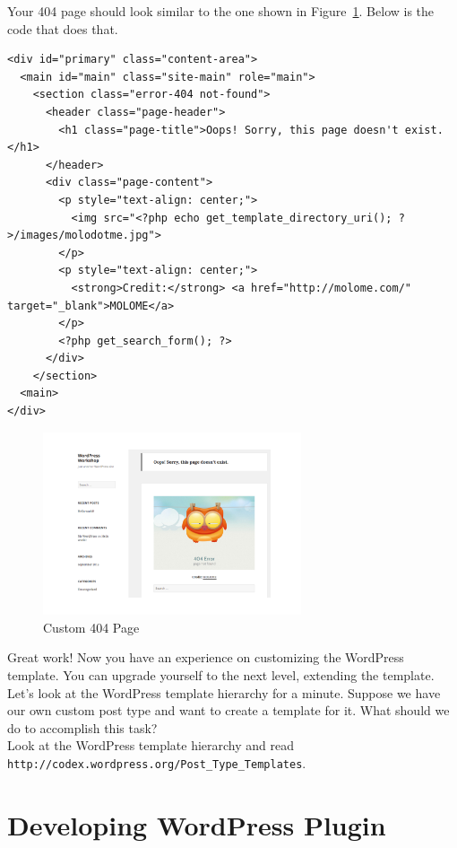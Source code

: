 \documentclass{article}
\begin{document}
\noindent Your 404 page should look similar to the one shown in
Figure~\ref{fig:custom-404-page}. Below is the code that does that.

\begin{verbatim}
<div id="primary" class="content-area">
  <main id="main" class="site-main" role="main">
    <section class="error-404 not-found">
      <header class="page-header">
        <h1 class="page-title">Oops! Sorry, this page doesn't exist.</h1>
      </header>
      <div class="page-content">
        <p style="text-align: center;">
          <img src="<?php echo get_template_directory_uri(); ?>/images/molodotme.jpg">
        </p>
        <p style="text-align: center;">
          <strong>Credit:</strong> <a href="http://molome.com/" target="_blank">MOLOME</a>
        </p>
        <?php get_search_form(); ?>
      </div>
    </section>
  <main>
</div>
\end{verbatim}

\begin{figure}[t]
    \centering
    \includegraphics[width=3in]{figures/custom-404-page}
    \caption{Custom 404 Page}
    \label{fig:custom-404-page}
\end{figure}

\noindent Great work! Now you have an experience on customizing the WordPress
template. You can upgrade yourself to the next level, extending the template.
\\

 Let's look at the WordPress template hierarchy for a
minute. Suppose we have our own custom post type and want to create a template
for it. What should we do to accomplish this task? \\

 Look at the WordPress template hierarchy and read {\tt
http://codex.wordpress.org/Post\_Type\_Templates}.

\section*{Developing WordPress Plugin}
\end{document}
